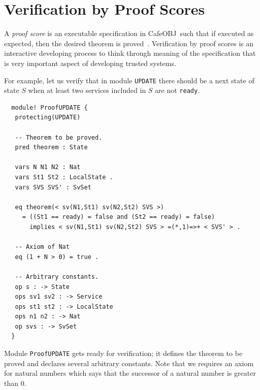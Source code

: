 \documentclass[12pt]{report}
\newcommand{\cafeobj}{{\sf CafeOBJ}~}
\begin{document}
\section{Verification by Proof Scores}
\label{sec:pscore}
A {\it proof score} is an executable specification in \cafeobj such
that if executed as expected, then the desired theorem is
proved~\cite{FutatsugiGO12pps}. Verification by proof scores is an
interactive developing process to think through meaning of the
specification that is very important aspect of developing trusted
systems.

For example, let us verify that in module {\tt UPDATE} there should be
a next state of state $S$ when at least two services included in $S$
are not {\tt ready}.
\small
\begin{verbatim}
  module! ProofUPDATE {
   protecting(UPDATE)
  
   -- Theorem to be proved.
   pred theorem : State
  
   vars N N1 N2 : Nat
   vars St1 St2 : LocalState .
   vars SVS SVS' : SvSet
  
   eq theorem(< sv(N1,St1) sv(N2,St2) SVS >)
     = ((St1 == ready) = false and (St2 == ready) = false)
       implies < sv(N1,St1) sv(N2,St2) SVS > =(*,1)=>+ < SVS' > .
  
   -- Axiom of Nat
   eq (1 + N > 0) = true .
  
   -- Arbitrary constants.
   op s : -> State
   ops sv1 sv2 : -> Service
   ops st1 st2 : -> LocalState
   ops n1 n2 : -> Nat
   op svs : -> SvSet
  }
\end{verbatim}
\normalsize
Module {\tt ProofUPDATE} gets ready for verification; it defines the
theorem to be proved and declares several arbitrary constants.  Note
that we requires an axiom for natural numbers which says that the
successor of a natural number is greater than 0.
\end{document}
